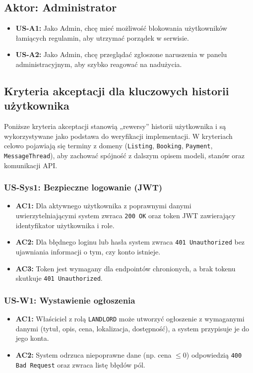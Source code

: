 \documentclass[11pt, a4paper]{article}
\begin{document}
\subsection{Aktor: Administrator}
\begin{itemize}
    \item \textbf{US-A1:} Jako Admin, chcę mieć możliwość blokowania użytkowników łamiących regulamin, aby utrzymać porządek w serwisie.
    \item \textbf{US-A2:} Jako Admin, chcę przeglądać zgłoszone naruszenia w panelu administracyjnym, aby szybko reagować na nadużycia.
\end{itemize}


\subsection{Kryteria akceptacji dla kluczowych historii użytkownika}
Poniższe kryteria akceptacji stanowią „rewersy” historii użytkownika i są wykorzystywane jako
podstawa do weryfikacji implementacji. W kryteriach celowo pojawiają się terminy z domeny
(\texttt{Listing}, \texttt{Booking}, \texttt{Payment}, \texttt{MessageThread}), aby zachować spójność
z dalszym opisem modeli, stanów oraz komunikacji API.

\subsubsection{US-Sys1: Bezpieczne logowanie (JWT)}
\begin{itemize}
    \item \textbf{AC1:} Dla aktywnego użytkownika z poprawnymi danymi uwierzytelniającymi system zwraca \texttt{200 OK} oraz token JWT zawierający identyfikator użytkownika i role.
    \item \textbf{AC2:} Dla błędnego loginu lub hasła system zwraca \texttt{401 Unauthorized} bez ujawniania informacji o tym, czy konto istnieje.
    \item \textbf{AC3:} Token jest wymagany dla endpointów chronionych, a brak tokenu skutkuje \texttt{401 Unauthorized}.
\end{itemize}

\subsubsection{US-W1: Wystawienie ogłoszenia}
\begin{itemize}
    \item \textbf{AC1:} Właściciel z rolą \texttt{LANDLORD} może utworzyć ogłoszenie z wymaganymi danymi (tytuł, opis, cena, lokalizacja, dostępność), a system przypisuje je do jego konta.
    \item \textbf{AC2:} System odrzuca niepoprawne dane (np. cena $\leq 0$) odpowiedzią \texttt{400 Bad Request} oraz zwraca listę błędów pól.
\end{itemize}
\end{document}
